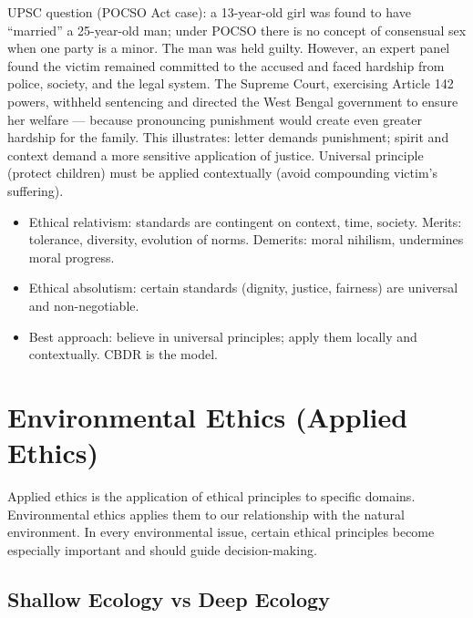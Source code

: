 \begin{PYQLink}
UPSC question (POCSO Act case): a 13-year-old girl was found to have ``married'' a 25-year-old man; under POCSO there is no concept of consensual sex when one party is a minor. The man was held guilty. However, an expert panel found the victim remained committed to the accused and faced hardship from police, society, and the legal system. The Supreme Court, exercising Article 142 powers, withheld sentencing and directed the West Bengal government to ensure her welfare --- because pronouncing punishment would create even greater hardship for the family. This illustrates: letter demands punishment; spirit and context demand a more sensitive application of justice. Universal principle (protect children) must be applied contextually (avoid compounding victim's suffering).
\end{PYQLink}

\begin{QuickRevision}
\begin{itemize}
\item Ethical relativism: standards are contingent on context, time, society. Merits: tolerance, diversity, evolution of norms. Demerits: moral nihilism, undermines moral progress.
\item Ethical absolutism: certain standards (dignity, justice, fairness) are universal and non-negotiable.
\item Best approach: believe in universal principles; apply them locally and contextually. CBDR is the model.
\end{itemize}
\end{QuickRevision}

\section{Environmental Ethics (Applied Ethics)}

Applied ethics is the application of ethical principles to specific domains. Environmental ethics applies them to our relationship with the natural environment. In every environmental issue, certain ethical principles become especially important and should guide decision-making.

\subsection{Shallow Ecology vs Deep Ecology}

